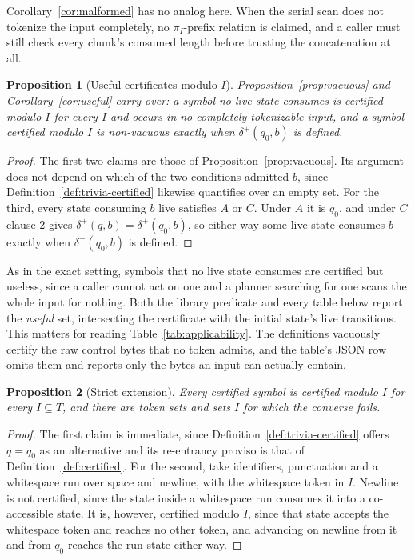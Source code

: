 \documentclass[11pt,a4paper]{article}
\theoremstyle{definition}
\theoremstyle{plain}
\newtheorem{proposition}{Proposition}
\begin{document}
Corollary~\ref{cor:malformed} has no analog here. When the serial scan does not tokenize the input completely, no
$\pi_I$-prefix relation is claimed, and a caller must still check every chunk's consumed length before trusting the
concatenation at all.

\begin{proposition}[Useful certificates modulo $I$]
\label{prop:useful}
Proposition~\ref{prop:vacuous} and Corollary~\ref{cor:useful} carry over: a symbol no live state consumes is certified
modulo $I$ for every $I$ and occurs in no completely tokenizable input, and a symbol certified modulo $I$ is non-vacuous
exactly when $\delta^+(q_0, b)$ is defined.
\end{proposition}

\begin{proof}
The first two claims are those of Proposition~\ref{prop:vacuous}. Its argument does not depend on which of the two
conditions admitted $b$, since Definition~\ref{def:trivia-certified} likewise quantifies over an empty set. For the
third, every state consuming $b$ live satisfies $A$ or $C$. Under $A$ it is $q_0$, and under $C$ clause 2 gives
$\delta^+(q, b) = \delta^+(q_0, b)$, so either way some live state consumes $b$ exactly when $\delta^+(q_0, b)$ is
defined.
\end{proof}

As in the exact setting, symbols that no live state consumes are certified but useless, since a caller cannot act on one
and a planner searching for one scans the whole input for nothing. Both the library predicate and every table below
report the \emph{useful} set, intersecting the certificate with the initial state's live transitions. This matters for
reading Table~\ref{tab:applicability}. The definitions vacuously certify the raw control bytes that no token admits, and
the table's JSON row omits them and reports only the bytes an input can actually contain.

\begin{proposition}[Strict extension]
\label{prop:extends}
Every certified symbol is certified modulo $I$ for every $I \subseteq T$, and there are token sets and sets $I$ for
which the converse fails.
\end{proposition}

\begin{proof}
The first claim is immediate, since Definition~\ref{def:trivia-certified} offers $q = q_0$ as an alternative and its
re-entrancy proviso is that of Definition~\ref{def:certified}. For the second, take identifiers, punctuation and a
whitespace run over space and newline, with the whitespace token in $I$. Newline is not certified, since the state
inside a whitespace run consumes it into a co-accessible state. It is, however, certified modulo $I$, since that state
accepts the whitespace token and reaches no other token, and advancing on newline from it and from $q_0$ reaches the run
state either way.
\end{proof}
\end{document}
